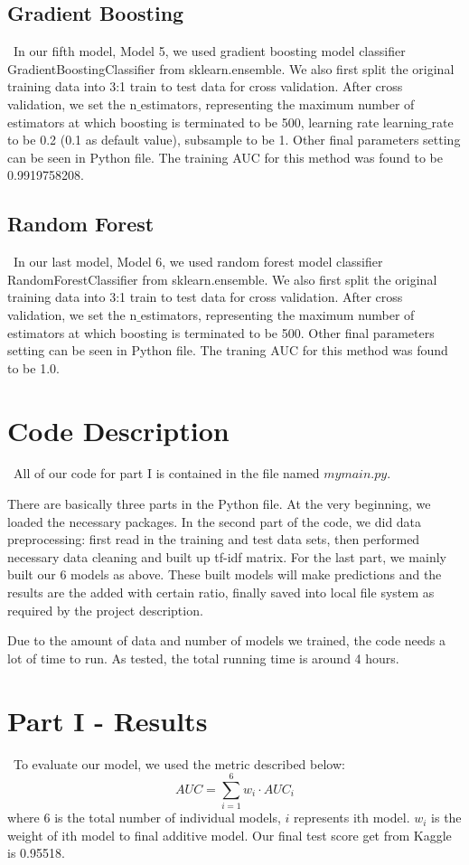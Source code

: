 \documentclass[12pt]{article}
\begin{document}
\subsection{Gradient Boosting}
\quad\ In our fifth model, Model 5, we used gradient boosting model classifier GradientBoostingClassifier from sklearn.ensemble. We also first split the original training data into 3:1 train to test data for cross validation. After cross validation, we set the n${\_}$estimators, representing the maximum number of estimators at which boosting is terminated to be 500, learning rate learning${\_}$rate to be 0.2 (0.1 as default value), subsample to be 1. Other final parameters setting can be seen in Python file. The training AUC for this method was found to be 0.9919758208.

\subsection{Random Forest}
\quad\ In our last model, Model 6, we used random forest model classifier RandomForestClassifier from sklearn.ensemble. We also first split the original training data into 3:1 train to test data for cross validation. After cross validation, we set the n${\_}$estimators, representing the maximum number of estimators at which boosting is terminated to be 500. Other final parameters setting can be seen in Python file. The traning AUC for this method was found to be 1.0.

\section{Code Description}
\quad\ All of our code for part I is contained in the file named $mymain.py$. 

There are basically three parts in the Python file. At the very beginning, we loaded the necessary packages. In the second part of the code, we did data preprocessing: first read in the training and test data sets, then performed necessary data cleaning and built up tf-idf matrix. For the last part, we mainly built our 6 models as above. These built models will make predictions and the results are the added with certain ratio, finally saved into local file system as required by the project description.

Due to the amount of data and number of models we trained, the code needs a lot of time to run. As tested, the total running time is around 4 hours.

\section{Part I - Results}
\quad\ To evaluate our model, we used the metric described below:
\begin{equation}
AUC = \sum_{i=1}^6 w_{i} \cdot {AUC}_{i}
\end{equation}
where 6 is the total number of individual models, $i$ represents ith model. $ w_{i} $ is the weight of ith model to final additive model. Our final test score get from Kaggle is 0.95518.
\end{document}
